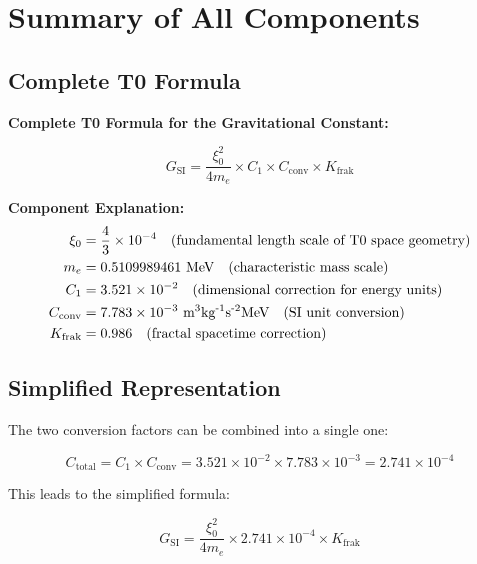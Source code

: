 \documentclass[12pt,a4paper]{article}
\begin{document}
	\section{Summary of All Components}
	
	\subsection{Complete T0 Formula}
	
	\begin{keyresult}
		\textbf{Complete T0 Formula for the Gravitational Constant:}
		
		\begin{equation}
			\boxed{G_{\text{SI}} = \frac{\xi_0^2}{4 m_e} \times C_1 \times C_{\text{conv}} \times K_{\text{frak}}}
			\label{eq:G_complete_detailed}
		\end{equation}
		
		\textbf{Component Explanation:}
		\begin{align}
			\xi_0 &= \frac{4}{3} \times 10^{-4} \quad \text{(fundamental length scale of T0 space geometry)} \\
			m_e &= 0.5109989461 \text{ MeV} \quad \text{(characteristic mass scale)} \\
			C_1 &= 3.521 \times 10^{-2} \quad \text{(dimensional correction for energy units)} \\
			C_{\text{conv}} &= 7.783 \times 10^{-3} \text{ m\textsuperscript{3}kg\textsuperscript{-1}s\textsuperscript{-2}MeV} \quad \text{(SI unit conversion)} \\
			K_{\text{frak}} &= 0.986 \quad \text{(fractal spacetime correction)}
		\end{align}
	\end{keyresult}
	
	\subsection{Simplified Representation}
	
	The two conversion factors can be combined into a single one:
	
	\begin{equation}
		C_{\text{total}} = C_1 \times C_{\text{conv}} = 3.521 \times 10^{-2} \times 7.783 \times 10^{-3} = 2.741 \times 10^{-4}
	\end{equation}
	
	This leads to the simplified formula:
	
	\begin{equation}
		\boxed{G_{\text{SI}} = \frac{\xi_0^2}{4 m_e} \times 2.741 \times 10^{-4} \times K_{\text{frak}}}
	\end{equation}
	
\end{document}
